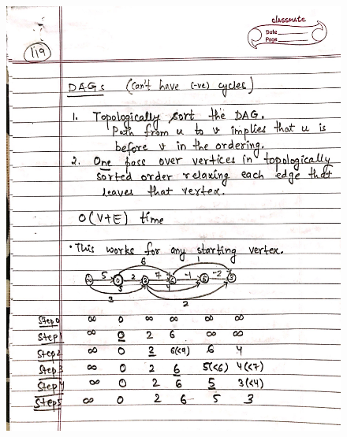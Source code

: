 \begin{figure}[H]
    \centering
    \includegraphics[scale=0.25]{"./MIT-6.006/MIT-6006-119"}
\end{figure}
\newpage
